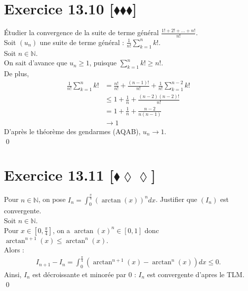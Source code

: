 \documentclass[10pt]{article}
\begin{document}
\section*{Exercice 13.10 [$\blacklozenge\blacklozenge\blacklozenge$]}
\begin{tcolorbox}[enhanced, width=7.6in, center, size=fbox, fontupper=\large, drop shadow southwest]
    Étudier la convergence de la suite de terme général $\frac{1! + 2! + ... + n!}{n!}$.\\
    Soit $(u_n)$ une suite de terme général : $\frac{1}{n!}\sum_{k=1}^nk!$.\\
    Soit $n\in\mathbb{N}$.\\
    On sait d'avance que $u_n \geq 1$, puisque $\sum_{k=1}^nk! \geq n!$.\\
    De plus,
    \begin{align*}
        \frac{1}{n!}\sum_{k=1}^nk! &= \frac{n!}{n!} + \frac{(n-1)!}{n!} + \frac{1}{n!}\sum_{k=1}^{n-2}k!\\
        &\leq 1 + \frac{1}{n} + \frac{(n-2)(n-2)!}{n!}\\
        &= 1 + \frac{1}{n} + \frac{n-2}{n(n-1)}\\
        &\longrightarrow 1 
    \end{align*}
    D'après le théorème des gendarmes (AQAB), $u_n \to 1$.\\
    \qed 
\end{tcolorbox}


\section*{Exercice 13.11 [$\blacklozenge\lozenge\lozenge$]}
\begin{tcolorbox}[enhanced, width=7.6in, center, size=fbox, fontupper=\large, drop shadow southwest]
    Pour $n\in\mathbb{N}$, on pose $I_n = \int_0^{\frac{\pi}{4}}(\arctan(x))^ndx$. Justifier que $(I_n)$ est convergente.\\
    Soit $n\in\mathbb{N}$.\\
    Pour $x\in[0, \frac{\pi}{4}]$, on a $\arctan(x)^n \in [0,1]$ donc $\arctan^{n+1}(x) \leq \arctan^n(x)$.\\
    Alors :
    \begin{align*}
        I_{n+1} - I_n = \int_0^{\frac{\pi}{4}}\left( \arctan^{n+1}(x) - \arctan^n(x) \right)dx \leq 0.
    \end{align*}
    Ainsi, $I_n$ est décroissante et minorée par 0 : $I_n$ est convergente d'apres le TLM.\\
    \qed
\end{tcolorbox}
\end{document}
